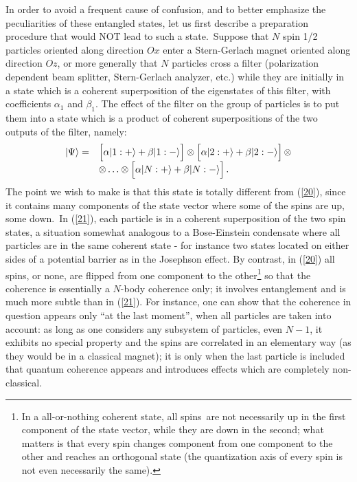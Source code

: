 \documentclass[12pt,onecolumn]{article}%
\begin{document}
In order to avoid a frequent cause of confusion, and to better emphasize the
peculiarities of these entangled states, let us first describe a preparation
procedure that would NOT lead to such a state.\ Suppose that $N$ spin 1/2
particles oriented along direction $Ox$ enter a Stern-Gerlach magnet oriented
along direction $Oz$, or more generally that $N$ particles cross a filter
(polarization dependent beam splitter, Stern-Gerlach analyzer, etc.) while
they are initially in a state which is a coherent superposition of the
eigenstates of this filter, with coefficients $\alpha_{1}$ and $\beta_{1}$.
The effect of the filter on the group of particles is to put them into a state
which is a product of coherent superpositions of the two outputs of the
filter, namely:%
\begin{equation}%
\begin{array}
[c]{cl}%
|\Psi\rangle = & \left[  \alpha|1:+\rangle +\beta|\overset{}{1}:-\rangle \right]
\otimes\left[  \alpha|2:+\rangle +\beta|\overset{}{2}:-\rangle \right]  \otimes\\
& \otimes \ldots \otimes\left[  \alpha| N:+\rangle +\beta|\overset{}{N}:-\rangle \right].
\end{array}
\label{21}%
\end{equation}
The point we wish to make is that this state is totally different from
(\ref{20}), since it contains many components of the state vector where some
of the spins are up, some down.\ In (\ref{21}), each particle is in a coherent
superposition of the two spin states, a situation somewhat analogous to a
Bose-Einstein condensate where all particles are in the same coherent state -
for instance two states located on either sides of a potential barrier as in
the Josephson effect. By contrast, in (\ref{20}) all spins, or none, are
flipped from one component to the other\footnote{In a all-or-nothing coherent
state, all spins\ are not necessarily up in the first component of the state
vector, while they are down in the second; what matters is that every spin
changes component from one component to the other and reaches an orthogonal
state (the quantization axis of every spin is not even necessarily the same).}
so that the coherence is essentially a $N$-body coherence only; it involves
entanglement and is much more subtle than in (\ref{21}). For instance, one can
show \cite{FL2} that the coherence in question appears only ``at the last
moment'', when all particles are taken into account: as long as one considers
any subsystem of particles, even $N-1$, it exhibits no special property and
the spins are correlated in an elementary way (as they would be in a classical
magnet); it is only when the last particle is included that quantum coherence
appears and introduces effects which are completely non-classical.
\end{document}
